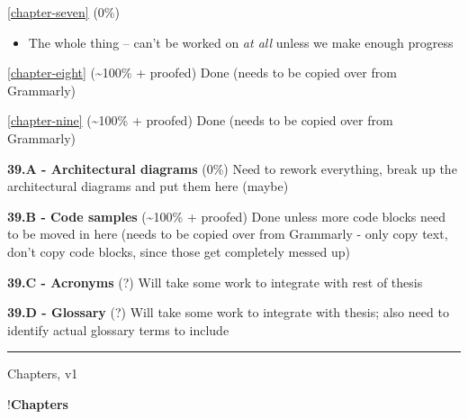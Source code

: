 \autoref{chapter-seven} (0\%)

\begin{itemize}
\tightlist
\item
  The whole thing -- can't be worked on \emph{at all} unless we make
  enough progress
\end{itemize}

\autoref{chapter-eight} (\textasciitilde100\% + proofed) Done (needs
to be copied over from Grammarly)

\autoref{chapter-nine} (\textasciitilde100\% + proofed) Done (needs
to be copied over from Grammarly)

\textbf{39.A - Architectural diagrams} (0\%) Need to rework everything,
break up the architectural diagrams and put them here (maybe)

\textbf{39.B - Code samples} (\textasciitilde100\% + proofed) Done
unless more code blocks need to be moved in here (needs to be copied
over from Grammarly - only copy text, don't copy code blocks, since
those get completely messed up)

\textbf{39.C - Acronyms} (?) Will take some work to integrate with rest
of thesis

\textbf{39.D - Glossary} (?) Will take some work to integrate with
thesis; also need to identify actual glossary terms to include

\begin{center}\rule{0.5\linewidth}{0.5pt}\end{center}

Chapters, v1

!\textbf{Chapters}
